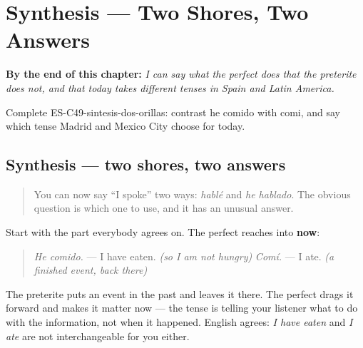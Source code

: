
\chapter{Synthesis --- Two Shores, Two Answers}
\label{ch:synthesis-perfect}

\begin{chapteropening}
\textbf{By the end of this chapter:} \emph{I can say what the perfect does that the preterite does not, and that today takes different tenses in Spain and Latin America.}

Complete ES-C49-sintesis-dos-orillas: contrast he comido with comi, and say which tense Madrid and Mexico City choose for today.
\end{chapteropening}

\section[Practice]{Synthesis — two shores, two answers}

\label{lesson:ES-C49-sintesis-dos-orillas}



\begin{quote}
You can now say \textquotedblleft{}I spoke\textquotedblright{} two ways: \emph{hablé} and \emph{he hablado}. The obvious question is which one to use, and it has an unusual answer.
\end{quote}

\begin{grammarlens}[title={Grammar Lens: what the perfect is for}]
Start with the part everybody agrees on. The perfect reaches into \textbf{now}:

\begin{quote}
\emph{He comido.} — I have eaten. \emph{(so I am not hungry)} \emph{Comí.} — I ate. \emph{(a finished event, back there)}
\end{quote}

The preterite puts an event in the past and leaves it there. The perfect drags it forward and makes it matter now — the tense is telling your listener what to do with the information, not when it happened. English agrees: \emph{I have eaten} and \emph{I ate} are not interchangeable for you either.
\end{grammarlens}

